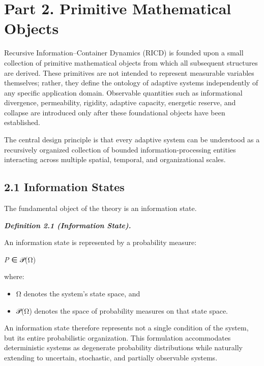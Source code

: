 \documentclass[
]{article}
\begin{document}
\hypertarget{part-2.-primitive-mathematical-objects}{%
\section{Part 2. Primitive Mathematical
Objects}\label{part-2.-primitive-mathematical-objects}}

Recursive Information--Container Dynamics (RICD) is founded upon a small
collection of primitive mathematical objects from which all subsequent
structures are derived. These primitives are not intended to represent
measurable variables themselves; rather, they define the ontology of
adaptive systems independently of any specific application domain.
Observable quantities such as informational divergence, permeability,
rigidity, adaptive capacity, energetic reserve, and collapse are
introduced only after these foundational objects have been established.

The central design principle is that every adaptive system can be
understood as a recursively organized collection of bounded
information-processing entities interacting across multiple spatial,
temporal, and organizational scales.

\hypertarget{information-states}{%
\subsection{2.1 Information States}\label{information-states}}

The fundamental object of the theory is an information state.

\emph{\textbf{Definition 2.1 (Information State).}}

An information state is represented by a probability measure:

\emph{P} ∈ 𝒫(Ω)

where:

\begin{itemize}
\item
  Ω denotes the system's state space, and
\item
  𝒫(Ω) denotes the space of probability measures on that state space.
\end{itemize}

An information state therefore represents not a single condition of the
system, but its entire probabilistic organization. This formulation
accommodates deterministic systems as degenerate probability
distributions while naturally extending to uncertain, stochastic, and
partially observable systems.
\end{document}
